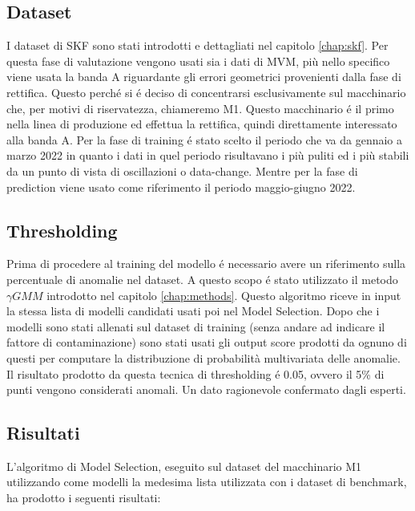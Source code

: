 \subsection{Dataset}
I dataset di SKF sono stati introdotti e dettagliati nel capitolo \ref{chap:skf}. Per questa fase di valutazione vengono usati sia i dati di MVM, più nello specifico viene usata la banda A riguardante gli errori geometrici provenienti dalla fase di rettifica. Questo perché si é deciso di concentrarsi esclusivamente sul macchinario che, per motivi di riservatezza, chiameremo M1. Questo macchinario é il primo nella linea di produzione ed effettua la rettifica, quindi direttamente interessato alla banda A.
Per la fase di training é stato scelto il periodo che va da gennaio a marzo 2022 in quanto i dati in quel periodo risultavano i più puliti ed i più stabili da un punto di vista di oscillazioni o data-change. Mentre per la fase di prediction viene usato come riferimento il periodo maggio-giugno 2022.



\subsection{Thresholding}
Prima di procedere al training del modello é necessario avere un riferimento sulla percentuale di anomalie nel dataset. A questo scopo é stato utilizzato il metodo ${\gamma}GMM$ introdotto nel capitolo \ref{chap:methods}.
Questo algoritmo riceve in input la stessa lista di modelli candidati usati poi nel Model Selection. Dopo che i modelli sono stati allenati sul dataset di training (senza andare ad indicare il fattore di contaminazione) sono stati usati gli output score prodotti da ognuno di questi per computare la distribuzione di probabilità multivariata delle anomalie.
Il risultato prodotto da questa tecnica di thresholding é 0.05, ovvero il 5\% di punti vengono considerati anomali. Un dato ragionevole confermato dagli esperti.


\subsection{Risultati}
L'algoritmo di Model Selection, eseguito sul dataset del macchinario M1 utilizzando come modelli la medesima lista utilizzata con i dataset di benchmark, ha prodotto i seguenti risultati:



